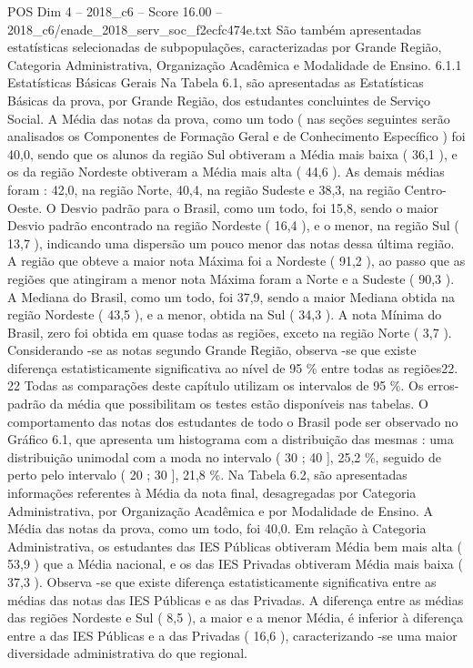 \begin{textsample}{POS Dim 4 – 2018\_c6 – Score 16.00 – 2018\_c6/enade\_2018\_serv\_soc\_f2ecfc474e.txt}
São também apresentadas estatísticas selecionadas de subpopulações, caracterizadas por Grande Região, Categoria Administrativa, Organização Acadêmica e Modalidade de Ensino. 6.1.1 Estatísticas Básicas Gerais Na Tabela 6.1, são apresentadas as Estatísticas Básicas da prova, por Grande Região, dos estudantes concluintes de Serviço Social.
A Média das notas da prova, como um todo ( nas seções seguintes serão analisados os Componentes de Formação Geral e de Conhecimento Específico ) foi 40,0, sendo que os alunos da região Sul obtiveram a Média mais baixa ( 36,1 ), e os da região Nordeste obtiveram a Média mais alta ( 44,6 ).
As demais médias foram : 42,0, na região Norte, 40,4, na região Sudeste e 38,3, na região Centro-Oeste.
O Desvio padrão para o Brasil, como um todo, foi 15,8, sendo o maior Desvio padrão encontrado na região Nordeste ( 16,4 ), e o menor, na região Sul ( 13,7 ), indicando uma dispersão um pouco menor das notas dessa última região.
A região que obteve a maior nota Máxima foi a Nordeste ( 91,2 ), ao passo que as regiões que atingiram a menor nota Máxima foram a Norte e a Sudeste ( 90,3 ).
A Mediana do Brasil, como um todo, foi 37,9, sendo a maior Mediana obtida na região Nordeste ( 43,5 ), e a menor, obtida na Sul ( 34,3 ).
A nota Mínima do Brasil, zero foi obtida em quase todas as regiões, exceto na região Norte ( 3,7 ).
Considerando -se as notas segundo Grande Região, observa -se que existe diferença estatisticamente significativa ao nível de 95 \% entre todas as regiões22. 22 Todas as comparações deste capítulo utilizam os intervalos de 95 \%.
Os erros-padrão da média que possibilitam os testes estão disponíveis nas tabelas.
O comportamento das notas dos estudantes de todo o Brasil pode ser observado no Gráfico 6.1, que apresenta um histograma com a distribuição das mesmas : uma distribuição unimodal com a moda no intervalo ( 30 ; 40 ], 25,2 \%, seguido de perto pelo intervalo ( 20 ; 30 ], 21,8 \%.
Na Tabela 6.2, são apresentadas informações referentes à Média da nota final, desagregadas por Categoria Administrativa, por Organização Acadêmica e por Modalidade de Ensino.
A Média das notas da prova, como um todo, foi 40,0.
Em relação à Categoria Administrativa, os estudantes das IES Públicas obtiveram Média bem mais alta ( 53,9 ) que a Média nacional, e os das IES Privadas obtiveram Média mais baixa ( 37,3 ).
Observa -se que existe diferença estatisticamente significativa entre as médias das notas das IES Públicas e as das Privadas.
A diferença entre as médias das regiões Nordeste e Sul ( 8,5 ), a maior e a menor Média, é inferior à diferença entre a das IES Públicas e a das Privadas ( 16,6 ), caracterizando -se uma maior diversidade administrativa do que regional.

\end{textsample}
